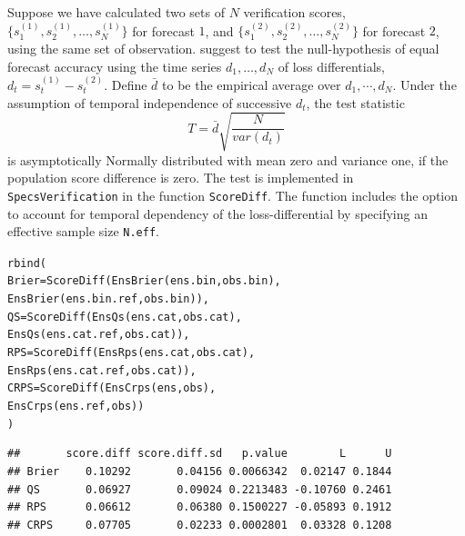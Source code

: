 \documentclass[10pt]{article}\usepackage[]{graphicx}\usepackage[]{color}
\makeatletter
\newcommand{\hlstd}[1]{\textcolor[rgb]{0,0,0}{#1}}%
\newcommand{\hlkwc}[1]{\textcolor[rgb]{0,0.502,0.753}{#1}}%
\newcommand{\hlkwd}[1]{\textcolor[rgb]{0,0.267,0.4}{#1}}%
\newenvironment{kframe}{%
 \def\at@end@of@kframe{}%
 \ifinner\ifhmode%
  \def\at@end@of@kframe{\end{minipage}}%
  \begin{minipage}{\columnwidth}%
 \fi\fi%
 \def\FrameCommand##1{\hskip\@totalleftmargin \hskip-\fboxsep
 \colorbox{shadecolor}{##1}\hskip-\fboxsep
     \hskip-\linewidth \hskip-\@totalleftmargin \hskip\columnwidth}%
 \MakeFramed {\advance\hsize-\width
   \@totalleftmargin\z@ \linewidth\hsize
   \@setminipage}}%
 {\par\unskip\endMakeFramed%
 \at@end@of@kframe}
\newenvironment{knitrout}{}{} %
\newcommand{\pkg}[1]{\texttt{#1}}
\newcommand{\code}[1]{\texttt{#1}}
\makeatother
\begin{document}
Suppose we have calculated two sets of $N$ verification scores, $\{s^{(1)}_1, s^{(1)}_2, \dots, s^{(1)}_N\}$ for forecast $1$, and $\{s^{(2)}_1, s^{(2)}_2, \dots, s^{(2)}_N\}$ for forecast $2$, using the same set of observation.
\citet{diebold1995comparing} suggest to test the null-hypothesis of equal forecast accuracy using the time series $d_1, \dots, d_N$ of loss differentials, $d_t = s^{(1)}_t - s^{(2)}_t$. 
Define $\bar{d}$ to be the empirical average over $d_1,\cdots, d_N$.
Under the assumption of temporal independence of successive $d_t$, the test statistic 
%
\begin{equation}
T = \bar{d}\sqrt{\frac{N}{var(d_t)}}
\end{equation}
%
is asymptotically Normally distributed with mean zero and variance one, if the population score difference is zero.
The test is implemented in \pkg{SpecsVerification} in the function \code{ScoreDiff}.
The function includes the option to account for temporal dependency of the loss-differential by specifying an effective sample size \code{N.eff}.
%
\begin{knitrout}
\color{fgcolor}\begin{kframe}
\begin{alltt}
\hlkwd{rbind}\hlstd{(}
  \hlkwc{Brier} \hlstd{=} \hlkwd{ScoreDiff}\hlstd{(}\hlkwd{EnsBrier}\hlstd{(ens.bin,     obs.bin),}
                    \hlkwd{EnsBrier}\hlstd{(ens.bin.ref, obs.bin)),}
  \hlkwc{QS}    \hlstd{=} \hlkwd{ScoreDiff}\hlstd{(}\hlkwd{EnsQs}\hlstd{(   ens.cat,     obs.cat),}
                    \hlkwd{EnsQs}\hlstd{(   ens.cat.ref, obs.cat)),}
  \hlkwc{RPS}   \hlstd{=} \hlkwd{ScoreDiff}\hlstd{(}\hlkwd{EnsRps}\hlstd{(  ens.cat,     obs.cat),}
                    \hlkwd{EnsRps}\hlstd{(  ens.cat.ref, obs.cat)),}
  \hlkwc{CRPS}  \hlstd{=} \hlkwd{ScoreDiff}\hlstd{(}\hlkwd{EnsCrps}\hlstd{( ens,         obs),}
                    \hlkwd{EnsCrps}\hlstd{( ens.ref,     obs))}
\hlstd{)}
\end{alltt}
\begin{verbatim}
##       score.diff score.diff.sd   p.value        L      U
## Brier    0.10292       0.04156 0.0066342  0.02147 0.1844
## QS       0.06927       0.09024 0.2213483 -0.10760 0.2461
## RPS      0.06612       0.06380 0.1500227 -0.05893 0.1912
## CRPS     0.07705       0.02233 0.0002801  0.03328 0.1208
\end{verbatim}
\end{kframe}
\end{knitrout}
\end{document}
